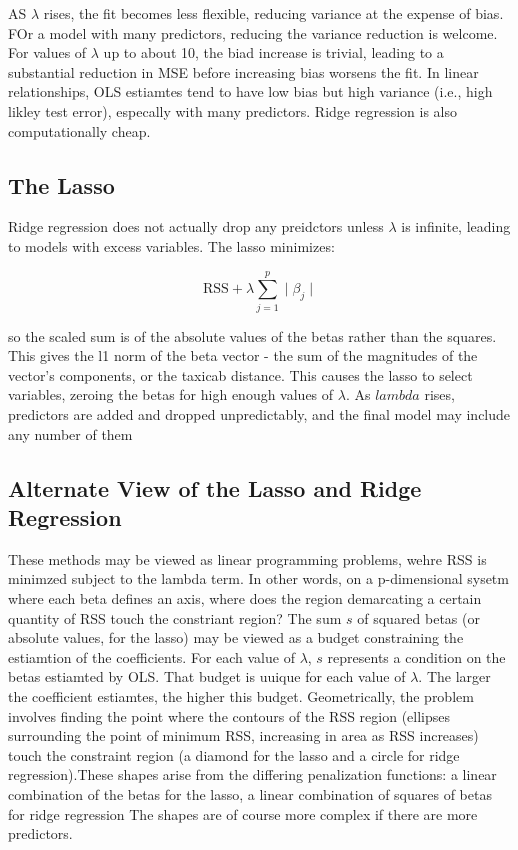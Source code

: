 \documentclass[
]{article}
\begin{document}
AS \(\lambda\) rises, the fit becomes less flexible, reducing variance
at the expense of bias. FOr a model with many predictors, reducing the
variance reduction is welcome. For values of \(\lambda\) up to about 10,
the biad increase is trivial, leading to a substantial reduction in MSE
before increasing bias worsens the fit. In linear relationships, OLS
estiamtes tend to have low bias but high variance (i.e., high likley
test error), especally with many predictors. Ridge regression is also
computationally cheap.

\hypertarget{the-lasso}{%
\subsection{The Lasso}\label{the-lasso}}

Ridge regression does not actually drop any preidctors unless
\(\lambda\) is infinite, leading to models with excess variables. The
lasso minimizes:

\[\text{RSS}+\lambda\sum^p_{j=1}\mid\beta_j\mid\]

so the scaled sum is of the absolute values of the betas rather than the
squares. This gives the l1 norm of the beta vector - the sum of the
magnitudes of the vector's components, or the taxicab distance. This
causes the lasso to select variables, zeroing the betas for high enough
values of \(\lambda\). As \(lambda\) rises, predictors are added and
dropped unpredictably, and the final model may include any number of
them

\hypertarget{alternate-view-of-the-lasso-and-ridge-regression}{%
\subsection{Alternate View of the Lasso and Ridge
Regression}\label{alternate-view-of-the-lasso-and-ridge-regression}}

These methods may be viewed as linear programming problems, wehre RSS is
minimzed subject to the lambda term. In other words, on a p-dimensional
sysetm where each beta defines an axis, where does the region
demarcating a certain quantity of RSS touch the constriant region? The
sum \(s\) of squared betas (or absolute values, for the lasso) may be
viewed as a budget constraining the estiamtion of the coefficients. For
each value of \(\lambda\), \(s\) represents a condition on the betas
estiamted by OLS. That budget is uuique for each value of \(\lambda\).
The larger the coefficient estiamtes, the higher this budget.
Geometrically, the problem involves finding the point where the contours
of the RSS region (ellipses surrounding the point of minimum RSS,
increasing in area as RSS increases) touch the constraint region (a
diamond for the lasso and a circle for ridge regression).These shapes
arise from the differing penalization functions: a linear combination of
the betas for the lasso, a linear combination of squares of betas for
ridge regression The shapes are of course more complex if there are more
predictors.
\end{document}
